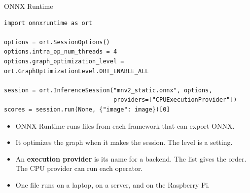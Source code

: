 \begin{frame}[fragile]{ONNX Runtime}
\begin{lstlisting}[style=python]
import onnxruntime as ort

options = ort.SessionOptions()
options.intra_op_num_threads = 4
options.graph_optimization_level = ort.GraphOptimizationLevel.ORT_ENABLE_ALL

session = ort.InferenceSession("mnv2_static.onnx", options,
                               providers=["CPUExecutionProvider"])
scores = session.run(None, {"image": image})[0]
\end{lstlisting}
  \small
  \begin{itemize}
    \item ONNX Runtime runs  files from each framework that can
          export ONNX.
    \item It optimizes the graph when it makes the session. The level is a
          setting.
    \item An \textbf{execution provider} is its name for a backend. The
          list  gives the order. The CPU provider can run
          each operator.
    \item One file runs on a laptop, on a server, and on the Raspberry Pi.
  \end{itemize}
\end{frame}


